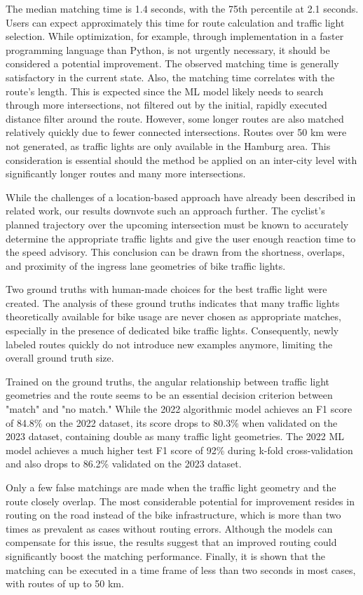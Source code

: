 The median matching time is 1.4 seconds, with the 75th percentile at 2.1 seconds. Users can expect approximately this time for route calculation and traffic light selection. While optimization, for example, through implementation in a faster programming language than Python, is not urgently necessary, it should be considered a potential improvement. The observed matching time is generally satisfactory in the current state. Also, the matching time correlates with the route's length. This is expected since the ML model likely needs to search through more intersections, not filtered out by the initial, rapidly executed distance filter around the route. However, some longer routes are also matched relatively quickly due to fewer connected intersections. Routes over 50 km were not generated, as traffic lights are only available in the Hamburg area. This consideration is essential should the method be applied on an inter-city level with significantly longer routes and many more intersections.

\begin{Summary}
While the challenges of a location-based approach have already been described in related work, our results downvote such an approach further. The cyclist's planned trajectory over the upcoming intersection must be known to accurately determine the appropriate traffic lights and give the user enough reaction time to the speed advisory. This conclusion can be drawn from the shortness, overlaps, and proximity of the ingress lane geometries of bike traffic lights. 

Two ground truths with human-made choices for the best traffic light were created. The analysis of these ground truths indicates that many traffic lights theoretically available for bike usage are never chosen as appropriate matches, especially in the presence of dedicated bike traffic lights. Consequently, newly labeled routes quickly do not introduce new examples anymore, limiting the overall ground truth size. 

Trained on the ground truths, the angular relationship between traffic light geometries and the route seems to be an essential decision criterion between "match" and "no match." While the 2022 algorithmic model achieves an F1 score of 84.8\% on the 2022 dataset, its score drops to 80.3\% when validated on the 2023 dataset, containing double as many traffic light geometries. The 2022 ML model achieves a much higher test F1 score of 92\% during k-fold cross-validation and also drops to 86.2\% validated on the 2023 dataset. 

Only a few false matchings are made when the traffic light geometry and the route closely overlap. The most considerable potential for improvement resides in routing on the road instead of the bike infrastructure, which is more than two times as prevalent as cases without routing errors. Although the models can compensate for this issue, the results suggest that an improved routing could significantly boost the matching performance. Finally, it is shown that the matching can be executed in a time frame of less than two seconds in most cases, with routes of up to 50 km. 
\end{Summary}

